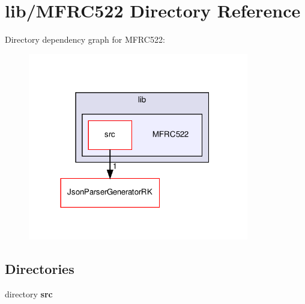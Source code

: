 \section{lib/\+M\+F\+R\+C522 Directory Reference}
\label{dir_b84635bd1be13c70485f5058d1d66f98}
Directory dependency graph for M\+F\+R\+C522\+:\nopagebreak
\begin{figure}[H]
\begin{center}
\leavevmode
\includegraphics[width=273pt]{dir_b84635bd1be13c70485f5058d1d66f98_dep}
\end{center}
\end{figure}
\subsection*{Directories}
\begin{DoxyCompactItemize}
\item 
directory \textbf{ src}
\end{DoxyCompactItemize}
